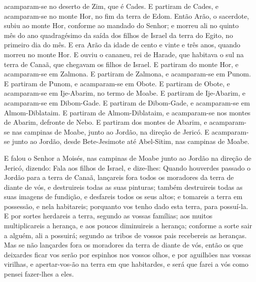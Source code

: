 acamparam-se no deserto de Zim, que é Cades. E partiram de
Cades, e acamparam-se no monte Hor, no fim da terra de Edom.
Então Arão, o sacerdote, subiu ao monte Hor, conforme ao
mandado do Senhor; e morreu ali no quinto mês do ano quadragésimo da
saída dos filhos de Israel da terra do Egito, no primeiro dia do
mês. E era Arão da idade de cento e vinte e três anos, quando
morreu no monte Hor. E ouviu o cananeu, rei de Harade, que
habitava o sul na terra de Canaã, que chegavam os filhos de Israel.
E partiram do monte Hor, e acamparam-se em Zalmona. E
partiram de Zalmona, e acamparam-se em Punom. E partiram de
Punom, e acamparam-se em Obote. E partiram de Obote, e
acamparam-se em Ije-Abarim, no termo de Moabe. E partiram de
Ije-Abarim, e acamparam-se em Dibom-Gade. E partiram de
Dibom-Gade, e acamparam-se em Almom-Diblataim. E partiram de
Almom-Diblataim, e acamparam-se nos montes de Abarim, defronte de
Nebo. E partiram dos montes de Abarim, e acamparam-se nas
campinas de Moabe, junto ao Jordão, na direção de Jericó. E
acamparam-se junto ao Jordão, desde Bete-Jesimote até Abel-Sitim,
nas campinas de Moabe.

E falou o Senhor a Moisés, nas campinas de Moabe junto ao Jordão
na direção de Jericó, dizendo: Fala aos filhos de Israel, e
dize-lhes: Quando houverdes passado o Jordão para a terra de Canaã,
lançareis fora todos os moradores da terra de diante de vós,
e destruireis todas as suas pinturas; também destruireis todas as
suas imagens de fundição, e desfareis todos os seus altos; e
tomareis a terra em possessão, e nela habitareis; porquanto vos
tenho dado esta terra, para possuí-la. E por sortes herdareis
a terra, segundo as vossas famílias; aos muitos multiplicareis a
herança, e aos poucos diminuireis a herança; conforme a sorte sair a
alguém, ali a possuirá; segundo as tribos de vossos pais recebereis
as heranças. Mas se não lançardes fora os moradores da terra
de diante de vós, então os que deixardes ficar vos serão por
espinhos nos vossos olhos, e por aguilhões nas vossas virilhas, e
apertar-vos-ão na terra em que habitardes, e será que farei a
vós como pensei fazer-lhes a eles.

\medskip

